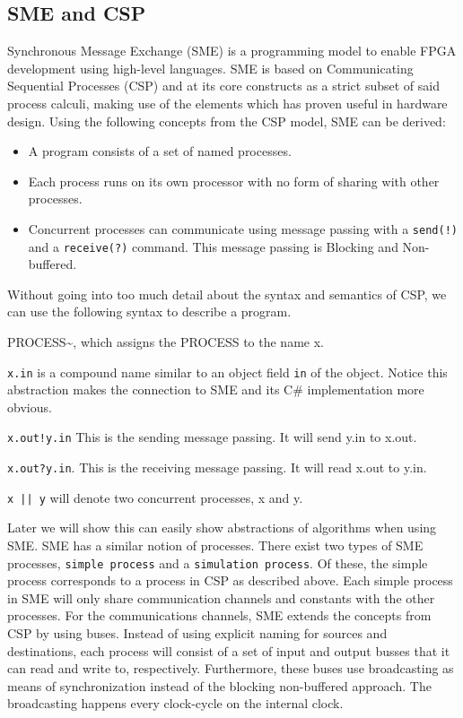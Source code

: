 \documentclass[a4paper]{article}
\begin{document}
\subsection{SME and CSP}
\label{sec:org31cfa11}
Synchronous Message Exchange (SME) is a programming model to enable FPGA development using high-level languages. SME is based on Communicating Sequential Processes (CSP) and at its core constructs as a strict subset of said process calculi, making use of the elements which has proven useful in hardware design\cite{sme}. Using the following concepts from the CSP model, SME can be derived:
\begin{itemize}
\item A program consists of a set of named processes.
\item Each process runs on its own processor with no form of sharing with other processes.
\item Concurrent processes can communicate using message passing with a \texttt{send(!)} and a \texttt{receive(?)} command. This message passing is Blocking and Non-buffered.
\end{itemize}
Without going into too much detail about the syntax and semantics of CSP\cite{CSP}, we can use the following syntax to describe a program.
\begin{description}
\item[{\textasciitilde{}x}] PROCESS\textasciitilde{}, which assigns the PROCESS to the name x.
\item \texttt{x.in} is a compound name similar to an object field \texttt{in} of the object. Notice this abstraction makes the connection to SME and its C\# implementation more obvious.
\item \texttt{x.out!y.in} This is the sending message passing. It will send y.in to x.out.
\item \texttt{x.out?y.in}. This is the receiving message passing. It will read x.out to y.in.
\item \texttt{x || y} will denote two concurrent processes, x and y.
\end{description}
Later we will show this can easily show abstractions of algorithms when using SME. SME has a similar notion of processes. There exist two types of SME processes, \texttt{simple process} and a \texttt{simulation process}. Of these, the simple process corresponds to a process in CSP as described above. Each simple process in SME will only share communication channels and constants with the other processes. For the communications channels, SME extends the concepts from CSP by using buses. Instead of using explicit naming for sources and destinations, each process will consist of a set of input and output busses that it can read and write to, respectively. Furthermore, these buses use broadcasting as means of synchronization instead of the blocking non-buffered approach.  The broadcasting happens every clock-cycle on the internal clock.
\end{document}
